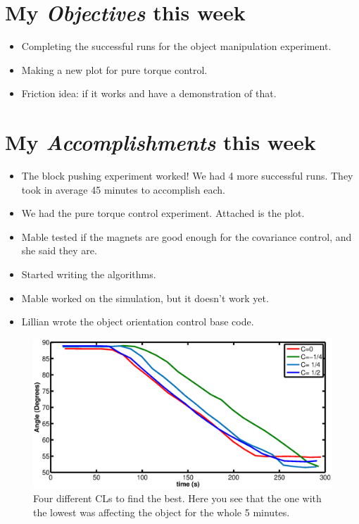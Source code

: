 \newcommand{\handoutName}{Weekly report}
\newcommand{\handoutdate}{\today}


\section{My \emph{Objectives} this week}
\begin{itemize}
\item Completing the successful runs for the object manipulation experiment.
\item Making a new plot for pure torque control.
\item Friction idea: if it works and have a demonstration of that.

\end{itemize}
\section{My \emph{Accomplishments} this week}


\begin{itemize}
\item The block pushing experiment worked! We had 4 more successful runs. They took in average 45 minutes to accomplish each.
\item We had the pure torque control experiment. Attached is the plot.
\item Mable tested if the magnets are good enough for the covariance control, and she said they are.
\item Started writing the algorithms.
\item Mable worked on the simulation, but it doesn't work yet. 
\item Lillian wrote the object orientation control base code.
\end{itemize}

\begin{figure}[h]
\begin{center}
\includegraphics[width=\columnwidth]{JulyTorqueControlAll}
\caption{Four different CLs to find the best. Here you see that the one with the lowest was affecting the object for the whole 5 minutes.}
\end{center}
\end{figure}


